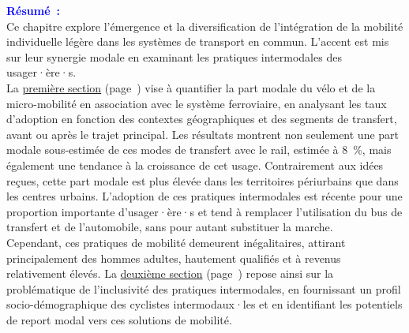 \begin{refsegment}
    \newpage
    \begin{tcolorbox}[colback=white!5!white,
                      colframe=blue!75!blue,
                      title=
                      \bigskip
                      \center{\textbf{Préambule du chapitre~4}}
                      \\
                      \raggedright{\small{Chapitre composé de \pagedifference{chap4:titre}{chap5:titre} pages, dont \pagedifference{chap4:bibliographie}{chap5:titre} pages de bibliographie}}
                      \bigskip]
\Large{\textcolor{blue}{\textbf{Résumé~:}}}
    \\
    \small{
Ce chapitre explore l'émergence et la diversification de l'intégration de la mobilité individuelle légère dans les systèmes de transport en commun. L'accent est mis sur leur synergie modale en examinant les pratiques intermodales des usager·ère·s.%
    \\
La \hyperref[section-chap4:progression-velo-micromobilite-aubaine]{première section} (page~\pageref{section-chap4:progression-velo-micromobilite-aubaine}) vise à quantifier la part modale du vélo et de la micro-mobilité en association avec le système ferroviaire, en analysant les taux d'adoption en fonction des contextes géographiques et des segments de transfert, avant ou après le trajet principal. Les résultats montrent non seulement une part modale sous-estimée de ces modes de transfert avec le rail, estimée à 8~\%, mais également une tendance à la croissance de cet usage. Contrairement aux idées reçues, cette part modale est plus élevée dans les territoires périurbains que dans les centres urbains. L'adoption de ces pratiques intermodales est récente pour une proportion importante d'usager·ère·s et tend à remplacer l'utilisation du bus de transfert et de l'automobile, sans pour autant substituer la marche.%
    \\
Cependant, ces pratiques de mobilité demeurent inégalitaires, attirant principalement des hommes adultes, hautement qualifiés et à revenus relativement élevés. La \hyperref[section-chap4:profil-sociodemographique]{deuxième section} (page~\pageref{section-chap4:profil-sociodemographique}) repose ainsi sur la problématique de l'inclusivité des pratiques intermodales, en fournissant un profil socio-démographique des cyclistes intermodaux·les et en identifiant les potentiels de report modal vers ces solutions de mobilité.%
    \\
}
\end{tcolorbox}
\end{refsegment}
